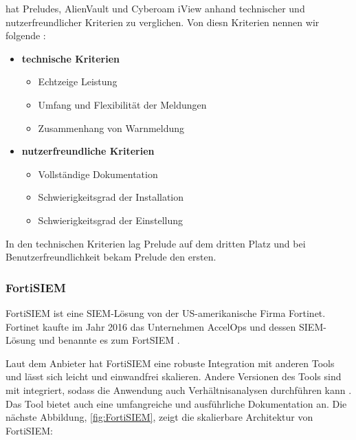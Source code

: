 \cite{Grammatikis_Prelude} hat Preludes, AlienVault und Cyberoam iView anhand technischer und nutzerfreundlicher Kriterien zu verglichen. Von diesn Kriterien nennen wir folgende \citep{Grammatikis_Prelude}:

\begin{itemize}[noitemsep]
   \item \textbf{technische Kriterien}
   \begin{itemize}[noitemsep]
      \item Echtzeige Leistung %
      \item Umfang und Flexibilität der Meldungen %
      \item Zusammenhang von Warnmeldung %
   \end{itemize}

   \item \textbf{nutzerfreundliche Kriterien}
   \begin{itemize}[noitemsep]
      \item Vollständige Dokumentation %
      \item Schwierigkeitsgrad der Installation %
      \item Schwierigkeitsgrad der Einstellung %
   \end{itemize}
\end{itemize}

In den technischen Kriterien lag Prelude auf dem dritten Platz und bei Benutzerfreundlichkeit bekam Prelude den ersten.



\newpage
\subsubsection{FortiSIEM}
FortiSIEM ist eine \gls{SIEM}-Lösung von der US-amerikanische Firma Fortinet. Fortinet kaufte im Jahr 2016 das Unternehmen AccelOps und dessen \gls{SIEM}-Lösung und benannte es zum FortSIEM \citep{Fortinet_Press}.

Laut dem Anbieter hat FortiSIEM eine robuste Integration mit anderen Tools und lässt sich leicht und einwandfrei skalieren. Andere Versionen des Tools sind mit  integriert, sodass die Anwendung auch Verhältnisanalysen durchführen kann \citep{Fortinet_Solutions}. Das Tool bietet auch eine umfangreiche und ausführliche Dokumentation an. Die nächste Abbildung, \ref{fig:FortiSIEM}, zeigt die skalierbare Architektur von FortiSIEM:

